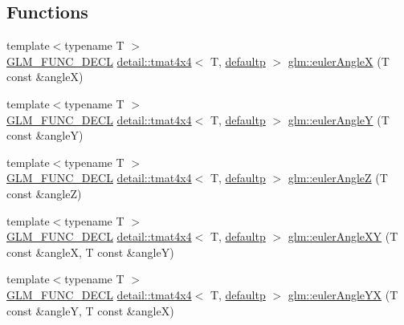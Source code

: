 \subsection*{Functions}
\begin{DoxyCompactItemize}
\item 
{\footnotesize template$<$typename T $>$ }\\\hyperlink{setup_8hpp_ab2d052de21a70539923e9bcbf6e83a51}{G\+L\+M\+\_\+\+F\+U\+N\+C\+\_\+\+D\+E\+CL} \hyperlink{structglm_1_1detail_1_1tmat4x4}{detail\+::tmat4x4}$<$ T, \hyperlink{namespaceglm_a0f04f086094c747d227af4425893f545a9d21ccd8b5a009ec7eb7677befc3bf51}{defaultp} $>$ \hyperlink{group__gtx__euler__angles_ga97994e53d856ae89ed2622d66ab86c2c}{glm\+::euler\+AngleX} (T const \&angleX)
\item 
{\footnotesize template$<$typename T $>$ }\\\hyperlink{setup_8hpp_ab2d052de21a70539923e9bcbf6e83a51}{G\+L\+M\+\_\+\+F\+U\+N\+C\+\_\+\+D\+E\+CL} \hyperlink{structglm_1_1detail_1_1tmat4x4}{detail\+::tmat4x4}$<$ T, \hyperlink{namespaceglm_a0f04f086094c747d227af4425893f545a9d21ccd8b5a009ec7eb7677befc3bf51}{defaultp} $>$ \hyperlink{group__gtx__euler__angles_gacdc188a23a928d57d4490ff7d646fb96}{glm\+::euler\+AngleY} (T const \&angleY)
\item 
{\footnotesize template$<$typename T $>$ }\\\hyperlink{setup_8hpp_ab2d052de21a70539923e9bcbf6e83a51}{G\+L\+M\+\_\+\+F\+U\+N\+C\+\_\+\+D\+E\+CL} \hyperlink{structglm_1_1detail_1_1tmat4x4}{detail\+::tmat4x4}$<$ T, \hyperlink{namespaceglm_a0f04f086094c747d227af4425893f545a9d21ccd8b5a009ec7eb7677befc3bf51}{defaultp} $>$ \hyperlink{group__gtx__euler__angles_gaf55b28c29ebd7ba728f1ad6490c89687}{glm\+::euler\+AngleZ} (T const \&angleZ)
\item 
{\footnotesize template$<$typename T $>$ }\\\hyperlink{setup_8hpp_ab2d052de21a70539923e9bcbf6e83a51}{G\+L\+M\+\_\+\+F\+U\+N\+C\+\_\+\+D\+E\+CL} \hyperlink{structglm_1_1detail_1_1tmat4x4}{detail\+::tmat4x4}$<$ T, \hyperlink{namespaceglm_a0f04f086094c747d227af4425893f545a9d21ccd8b5a009ec7eb7677befc3bf51}{defaultp} $>$ \hyperlink{group__gtx__euler__angles_ga83a52d36fd752c92ce189197b51ea785}{glm\+::euler\+Angle\+XY} (T const \&angleX, T const \&angleY)
\item 
{\footnotesize template$<$typename T $>$ }\\\hyperlink{setup_8hpp_ab2d052de21a70539923e9bcbf6e83a51}{G\+L\+M\+\_\+\+F\+U\+N\+C\+\_\+\+D\+E\+CL} \hyperlink{structglm_1_1detail_1_1tmat4x4}{detail\+::tmat4x4}$<$ T, \hyperlink{namespaceglm_a0f04f086094c747d227af4425893f545a9d21ccd8b5a009ec7eb7677befc3bf51}{defaultp} $>$ \hyperlink{group__gtx__euler__angles_ga7599a8aaf3bf33b15517dd522a6d8020}{glm\+::euler\+Angle\+YX} (T const \&angleY, T const \&angleX)

\end{DoxyCompactItemize}

